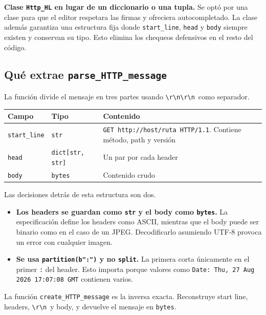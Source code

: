 \documentclass[11pt,a4paper]{article}
\newcommand{\crlf}{\texttt{\textbackslash r\textbackslash n}}
\newcommand{\cabtabla}[1]{\rowcolor{filahead}\textbf{#1}}
\begin{document}
\medskip
\noindent\textbf{Clase \texttt{Http\_HL} en lugar de un diccionario o una tupla.} Se optó por una
clase para que el editor respetara las firmas y ofreciera autocompletado. La clase además garantiza
una estructura fija donde \texttt{start\_line}, \texttt{head} y \texttt{body} siempre existen y
conservan su tipo. Esto elimina los chequeos defensivos en el resto del código.

\subsection{Qué extrae \texorpdfstring{\texttt{parse\_HTTP\_message}}{parse\_HTTP\_message}}

La función divide el mensaje en tres partes usando \crlf\crlf\ como separador.

\bigskip
\begin{tabularx}{\textwidth}{@{}l l X@{}}
\toprule
\cabtabla{Campo} & \cabtabla{Tipo} & \cabtabla{Contenido} \\
\midrule
\texttt{start\_line} & \texttt{str}            & \texttt{GET http://host/ruta HTTP/1.1}. Contiene método, path y versión \\
\texttt{head}        & \texttt{dict[str, str]} & Un par por cada header \\
\texttt{body}        & \texttt{bytes}          & Contenido crudo \\
\bottomrule
\end{tabularx}

\bigskip
\noindent Las decisiones detrás de esta estructura son dos.

\begin{itemize}
  \item \textbf{Los headers se guardan como \texttt{str} y el body como \texttt{bytes}.} La
        especificación define los headers como ASCII, mientras que el body puede ser binario como
        en el caso de un JPEG. Decodificarlo asumiendo UTF-8 provoca un error con cualquier imagen.
  \item \textbf{Se usa \texttt{partition(b":")} y no \texttt{split}.} La primera corta únicamente en
        el primer \texttt{:} del header. Esto importa porque valores como
        \texttt{Date: Thu, 27 Aug 2026 17:07:08 GMT} contienen varios.
\end{itemize}

\noindent La función \texttt{create\_HTTP\_message} es la inversa exacta. Reconstruye start line,
headers, \crlf\ y body, y devuelve el mensaje en \texttt{bytes}.
\end{document}
